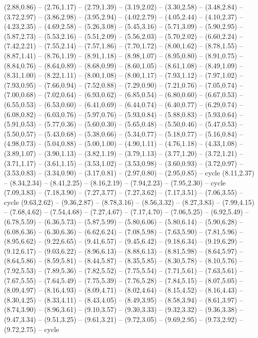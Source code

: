 \expandafter\def\csname geo:Hoehe:500\endcsname{
  (2.88,0.86) -- (2.76,1.17) -- (2.79,1.39) -- (3.19,2.02) -- (3.30,2.58) -- (3.48,2.84) -- (3.72,2.97) -- (3.86,2.98) -- (3.95,2.94) -- (4.02,2.79) -- (4.05,2.44) -- (4.10,2.37) -- (4.23,2.35) -- (4.69,2.58) -- (5.26,3.08) -- (5.45,3.16) -- (5.71,3.09) -- (5.90,2.95) -- (5.87,2.73) -- (5.53,2.16) -- (5.51,2.09) -- (5.56,2.03) -- (5.70,2.02) -- (6.60,2.24) -- (7.42,2.21) -- (7.55,2.14) -- (7.57,1.86) -- (7.70,1.72) -- (8.00,1.62) -- (8.78,1.55) -- (8.87,1.41) -- (8.76,1.19) -- (8.91,1.18) -- (8.98,1.07) -- (8.95,0.80) -- (8.91,0.75) -- (8.84,0.76) -- (8.64,0.89) -- (8.68,0.99) -- (8.60,1.05) -- (8.61,1.08) -- (8.49,1.09) -- (8.31,1.00) -- (8.22,1.11) -- (8.00,1.08) -- (8.00,1.17) -- (7.93,1.12) -- (7.97,1.02) -- (7.93,0.95) -- (7.66,0.94) -- (7.52,0.88) -- (7.29,0.90) -- (7.21,0.76) -- (7.05,0.74) -- (7.00,0.68) -- (7.02,0.64) -- (6.93,0.62) -- (6.85,0.54) -- (6.80,0.60) -- (6.67,0.53) -- (6.55,0.53) -- (6.53,0.60) -- (6.41,0.69) -- (6.44,0.74) -- (6.40,0.77) -- (6.29,0.74) -- (6.08,0.82) -- (6.03,0.76) -- (5.97,0.76) -- (5.93,0.84) -- (5.88,0.83) -- (5.93,0.64) -- (5.91,0.53) -- (5.77,0.36) -- (5.60,0.30) -- (5.65,0.48) -- (5.50,0.46) -- (5.47,0.53) -- (5.50,0.57) -- (5.43,0.68) -- (5.38,0.66) -- (5.34,0.77) -- (5.18,0.77) -- (5.16,0.84) -- (4.98,0.73) -- (5.04,0.88) -- (5.00,1.00) -- (4.90,1.11) -- (4.76,1.18) -- (4.33,1.08) -- (3.89,1.07) -- (3.90,1.13) -- (3.82,1.19) -- (3.79,1.13) -- (3.77,1.20) -- (3.72,1.21) -- (3.71,1.17) -- (3.61,1.15) -- (3.53,1.02) -- (3.53,0.98) -- (3.60,0.93) -- (3.72,0.97) -- (3.53,0.83) -- (3.34,0.90) -- (3.17,0.81) -- (2.97,0.80) -- (2.95,0.85) -- cycle
  (8.11,2.37) -- (8.34,2.34) -- (8.41,2.25) -- (8.16,2.19) -- (7.94,2.23) -- (7.95,2.30) -- cycle
  (7.09,3.83) -- (7.18,3.90) -- (7.27,3.77) -- (7.27,3.62) -- (7.17,3.51) -- (7.06,3.55) -- cycle
  (9.63,2.62) -- (9.36,2.87) -- (8.78,3.16) -- (8.56,3.32) -- (8.27,3.83) -- (7.99,4.15) -- (7.68,4.62) -- (7.54,4.68) -- (7.27,4.67) -- (7.17,4.70) -- (7.06,5.25) -- (6.92,5.49) -- (6.78,5.59) -- (6.36,5.73) -- (5.87,5.99) -- (5.80,6.06) -- (5.80,6.14) -- (5.90,6.28) -- (6.08,6.36) -- (6.30,6.36) -- (6.62,6.24) -- (7.08,5.98) -- (7.63,5.90) -- (7.81,5.96) -- (8.95,6.62) -- (9.22,6.65) -- (9.41,6.57) -- (9.45,6.42) -- (9.18,6.34) -- (9.19,6.29) -- (9.12,6.17) -- (9.03,6.22) -- (8.96,6.13) -- (8.88,6.13) -- (8.81,5.98) -- (8.64,5.97) -- (8.64,5.86) -- (8.59,5.81) -- (8.44,5.87) -- (8.35,5.85) -- (8.30,5.78) -- (8.10,5.76) -- (7.92,5.53) -- (7.89,5.36) -- (7.82,5.52) -- (7.75,5.54) -- (7.71,5.61) -- (7.63,5.61) -- (7.67,5.55) -- (7.64,5.49) -- (7.75,5.39) -- (7.76,5.28) -- (7.84,5.15) -- (8.07,5.05) -- (8.09,4.97) -- (8.16,4.93) -- (8.09,4.71) -- (8.02,4.64) -- (8.15,4.52) -- (8.16,4.43) -- (8.30,4.25) -- (8.33,4.11) -- (8.43,4.05) -- (8.49,3.95) -- (8.58,3.94) -- (8.61,3.97) -- (8.74,3.90) -- (8.96,3.61) -- (9.10,3.57) -- (9.30,3.33) -- (9.32,3.32) -- (9.36,3.38) -- (9.47,3.34) -- (9.51,3.25) -- (9.61,3.21) -- (9.72,3.05) -- (9.69,2.95) -- (9.73,2.92) -- (9.72,2.75) -- cycle
}
